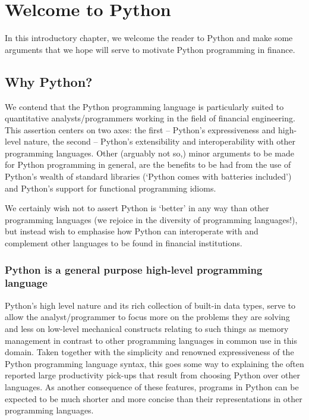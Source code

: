 \chapter{Welcome to Python}\label{ch:welcome-to-python}

In this introductory chapter, we welcome the reader to Python and make
some arguments that we hope will serve to motivate Python programming
in finance.

\section{Why Python?}

We contend that the Python programming language is particularly suited
to quantitative analysts/programmers working in the field of financial
engineering. This assertion centers on two axes: the first -- Python's
expressiveness and high-level nature, the second -- Python's
extensibility and interoperability with other programming
languages. Other (arguably not so,) minor arguments to be made for
Python programming in general, are the benefits to be had from the use
of Python's wealth of standard libraries (`Python comes with batteries
included') and Python's support for functional programming idioms.

We certainly wish not to assert Python is `better' in any way than
other programming languages (we rejoice in the diversity of
programming languages!), but instead wish to emphasise how Python can
interoperate with and complement other languages to be found in
financial institutions.

\subsection{Python is a general purpose high-level programming
language}

Python's high level nature and its rich collection of built-in data
types, serve to allow the analyst/programmer to focus more on the
problems they are solving and less on low-level mechanical constructs
relating to such things as memory management in contrast to other
programming languages in common use in this domain. Taken together
with the simplicity and renowned expressiveness of the Python
programming language syntax, this goes some way to explaining the
often reported large productivity pick-ups that result from choosing
Python over other languages. As another consequence of these features,
programs in Python can be expected to be much shorter and more concise
than their representations in other programming languages.


